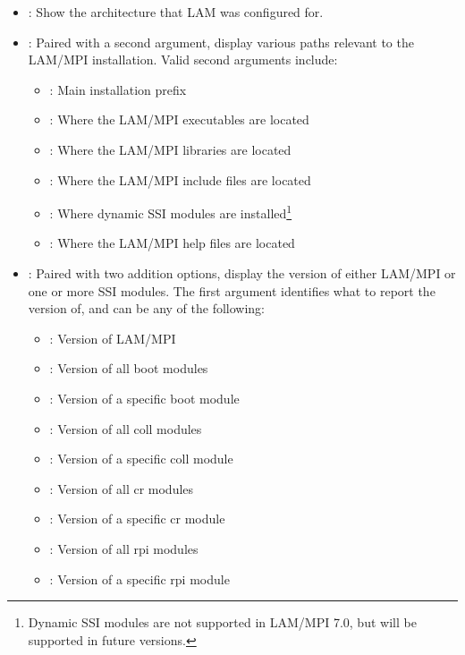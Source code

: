 \begin{itemize}
\item {}: Show the architecture that LAM was configured
  for.

\item {}: Paired with a second argument, display various
  paths relevant to the LAM/MPI installation.  Valid second arguments
  include: 

  \begin{itemize}
  \item {}: Main installation prefix
  \item {}: Where the LAM/MPI executables are located
  \item {}: Where the LAM/MPI libraries are located
  \item {}: Where the LAM/MPI include files are located
  \item {}: Where dynamic SSI modules are
    installed\footnote{Dynamic SSI modules are not supported in
      LAM/MPI 7.0, but will be supported in future versions.}
  \item {}: Where the LAM/MPI help files are located
  \end{itemize}

\item {}: Paired with two addition options, display the
  version of either LAM/MPI or one or more SSI modules.  The first
  argument identifies what to report the version of, and can be any of
  the following:

  \begin{itemize}
  \item {}: Version of LAM/MPI
  \item {}: Version of all boot modules
  \item {}: Version of a specific boot module
  \item {}: Version of all coll modules
  \item {}: Version of a specific coll module
  \item {}: Version of all cr modules
  \item {}: Version of a specific cr module
  \item {}: Version of all rpi modules
  \item {}: Version of a specific rpi module
  \end{itemize}


\end{itemize}
